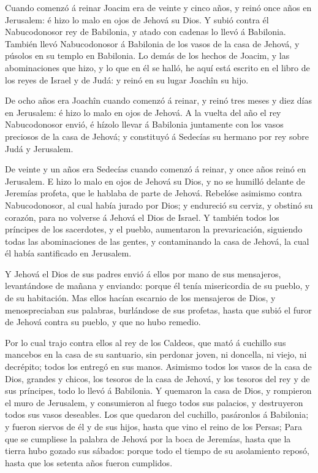  Cuando comenzó á reinar Joacim era de veinte y cinco años,
y reinó once años en Jerusalem: é hizo lo malo en ojos de Jehová su
Dios.  Y subió contra él Nabucodonosor rey de Babilonia, y
atado con cadenas lo llevó á Babilonia.  También llevó
Nabucodonosor á Babilonia de los vasos de la casa de Jehová, y púsolos
en su templo en Babilonia.  Lo demás de los hechos de
Joacim, y las abominaciones que hizo, y lo que en él se halló, he aquí
está escrito en el libro de los reyes de Israel y de Judá: y reinó en su
lugar Joachîn su hijo.

 De ocho años era Joachîn cuando comenzó á reinar, y reinó
tres meses y diez días en Jerusalem: é hizo lo malo en ojos de Jehová.
 A la vuelta del año el rey Nabucodonosor envió, é hízolo
llevar á Babilonia juntamente con los vasos preciosos de la casa de
Jehová; y constituyó á Sedecías su hermano por rey sobre Judá y
Jerusalem.

 De veinte y un años era Sedecías cuando comenzó á reinar,
y once años reinó en Jerusalem.  E hizo lo malo en ojos de
Jehová su Dios, y no se humilló delante de Jeremías profeta, que le
hablaba de parte de Jehová.  Rebelóse asimismo contra
Nabucodonosor, al cual había jurado por Dios; y endureció su cerviz, y
obstinó su corazón, para no volverse á Jehová el Dios de Israel.
 Y también todos los príncipes de los sacerdotes, y el
pueblo, aumentaron la prevaricación, siguiendo todas las abominaciones
de las gentes, y contaminando la casa de Jehová, la cual él había
santificado en Jerusalem.

 Y Jehová el Dios de sus padres envió á ellos por mano de
sus mensajeros, levantándose de mañana y enviando: porque él tenía
misericordia de su pueblo, y de su habitación.  Mas ellos
hacían escarnio de los mensajeros de Dios, y menospreciaban sus
palabras, burlándose de sus profetas, hasta que subió el furor de Jehová
contra su pueblo, y que no hubo remedio.

 Por lo cual trajo contra ellos al rey de los Caldeos, que
mató á cuchillo sus mancebos en la casa de su santuario, sin perdonar
joven, ni doncella, ni viejo, ni decrépito; todos los entregó en sus
manos.  Asimismo todos los vasos de la casa de Dios,
grandes y chicos, los tesoros de la casa de Jehová, y los tesoros del
rey y de sus príncipes, todo lo llevó á Babilonia.  Y
quemaron la casa de Dios, y rompieron el muro de Jerusalem, y
consumieron al fuego todos sus palacios, y destruyeron todos sus vasos
deseables.  Los que quedaron del cuchillo, pasáronlos á
Babilonia; y fueron siervos de él y de sus hijos, hasta que vino el
reino de los Persas;  Para que se cumpliese la palabra de
Jehová por la boca de Jeremías, hasta que la tierra hubo gozado sus
sábados: porque todo el tiempo de su asolamiento reposó, hasta que los
setenta años fueron cumplidos.

